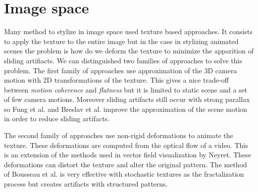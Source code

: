 

\section{Image space}


Many method to stylize in image space used texture based approaches. It consists to apply the texture to the entire image \cite{benard_state---art_2011} but in the case in stylizing animated scenes the problem is how do we deform the texture to minimize the apparition of sliding artifiacts. We can distinguished two families of approaches to solve this problem. The first family of approaches use approximation of the 3D camera motion with 2D transformations of the texture\cite{cunzi_dynamic_nodate}. This gives a nice trade-off between \textit{motion coherence} and \textit{flatness} but it is limited to static scene and a set of few camera motions. Moreover sliding artifacts still occur with strong parallax so Fung et al.\cite{fung_pen-and-ink_nodate} and Breslav et al.\cite{breslav_dynamic_nodate} improve the approximation of the scene motion in order to reduce sliding artifacts.

The second family of approaches use non-rigid deformations to animate the texture\cite{bousseau_video_2007}. These deformations are computed from the optical flow of a video. This is an extension of the methods used in vector field visualization by Neyret\cite{neyret_imagis-gravir_nodate}. These deformations can distort the texture and alter the original pattern. The method of Bousseau et al.\cite{bousseau_video_2007} is very effective with stochastic textures as the fractalization process but creates artifacts with structured patterns.
